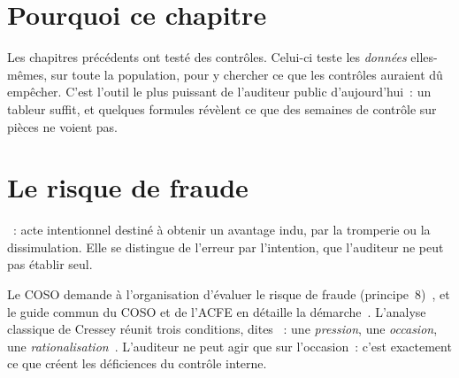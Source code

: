 \bigskip

\section*{Pourquoi ce chapitre}

Les chapitres précédents ont testé des contrôles. Celui-ci teste les
\emph{données} elles-mêmes, sur toute la population, pour y chercher ce
que les contrôles auraient dû empêcher. C'est l'outil le plus puissant de
l'auditeur public d'aujourd'hui~: un tableur suffit, et quelques
formules révèlent ce que des semaines de contrôle sur pièces ne
voient pas.

\separateur

\section{Le risque de fraude}
\label{sec:c12-risque}

\begin{boxdef}
~: acte intentionnel destiné à obtenir un
avantage indu, par la tromperie ou la dissimulation. Elle se distingue de
l'erreur par l'intention, que l'auditeur ne peut pas établir seul.
\end{boxdef}

Le COSO demande à l'organisation d'évaluer le risque de fraude
(principe~8)~\cite{coso2013icfr}, et le guide commun du COSO et de l'ACFE
en détaille la démarche~\cite{coso2016fraude}. L'analyse classique de
Cressey réunit trois conditions, dites ~: une \emph{pression}, une
\emph{occasion}, une \emph{rationalisation}~\cite{cressey1953}.
L'auditeur ne peut agir que sur l'occasion~: c'est exactement ce que
créent les déficiences du contrôle interne.

